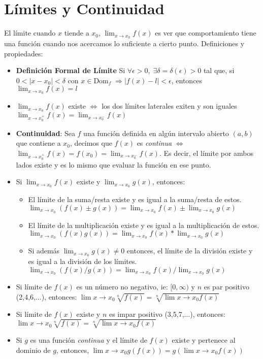 \documentclass[pdftex,11pt,a4paper]{article}
\begin{document}
\section{Límites y Continuidad}
El límite cuando $x$ tiende a $x_0$, $\lim_{x\rightarrow x_0}f(x)$ es ver que comportamiento tiene una función cuando nos acercamos lo suficiente  a cierto punto. Definiciones y propiedades: 
\begin{itemize}
	\item \textbf{Definición Formal de Límite} Si $\forall \epsilon > 0,\; \exists \delta = \delta(\epsilon) > 0$ tal que, si $0< |x - x_0| < \delta$ con $x\in \text{Dom}_f \; \Rightarrow |f(x) - l| < \epsilon$, entonces $\lim_{x \rightarrow x_0}f(x) = l$
	\item $\lim_{x\rightarrow x_0}f(x)$ existe $\iff$ los dos límites laterales exiten y son iguales $\lim_{x\rightarrow x_0^{+}}f(x) = \lim_{x\rightarrow x_0^{-}}f(x)$
	\item \textbf{Continuidad}: Sea $f$ una función definida en algún intervalo abierto $(a,b)$ que contiene a $x_0$, decimos que $f(x)$ es \textit{continua} $\iff$  $\lim_{x\rightarrow x_0^{+}}f(x) = f(x_0) =  \lim_{x\rightarrow x_0^{-}}f(x)$. Es decir, el límite por ambos lados existe y es lo mismo que evaluar la función en ese punto.
	\item Si $\lim_{x\rightarrow x_0}f(x)$ existe y $\lim_{x\rightarrow x_0}g(x)$, entonces:
	\begin{itemize}
		\item El límite de la suma/resta existe y es igual a la suma/resta de estos. $\lim_{x\rightarrow x_0}(f(x)\pm g(x)) = \lim_{x\rightarrow x_0}f(x) \pm \lim_{x\rightarrow x_0}g(x)$
		\item El límite de la multiplicación existe y es igual a la multiplicación de estos. $\lim_{x\rightarrow x_0}(f(x)g(x)) = \lim_{x\rightarrow x_0}f(x)*\lim_{x\rightarrow x_0}g(x)$
		\item Si además $\lim_{x\rightarrow x_0}g(x)\neq 0$ entonces, el límite de la división existe y es igual a la división de los límites. $\lim_{x\rightarrow x_0}(f(x)/g(x)) = \lim_{x\rightarrow x_0}f(x)/\lim_{x\rightarrow x_0}g(x)$
	\end{itemize}
	\item Si límite de $f(x)$ es un número no negativo, ie: $[0,\infty)$ y $n$ es par positivo (2,4,6,$\ldots$), entonces: $\lim{x\rightarrow x_0} \sqrt[n]{f(x)} = \sqrt[n]{\lim{x\rightarrow x_0}f(x)}$
	\item Si límite de $f(x)$ existe y $n$ es impar positivo (3,5,7,$\ldots$), entonces: $\lim{x\rightarrow x_0} \sqrt[n]{f(x)} = \sqrt[n]{\lim{x\rightarrow x_0}f(x)}$
	\item Si $g$ es una función \textit{continua} y el límite de $f(x)$ existe y pertenece al dominio de $g$, entonces, $\lim{x\rightarrow x_0}g(f(x)) = g(\lim{x\rightarrow x_0}f(x))$
	

\end{itemize}
\end{document}
